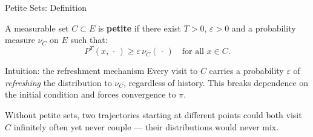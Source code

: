 \documentclass[aspectratio=169]{beamer}
\begin{document}
\begin{frame}{Petite Sets: Definition}

  \begin{definition}
    A measurable set $C \subset E$ is \textbf{petite} if there exist
    $T > 0$, $\varepsilon > 0$ and a probability measure $\nu_C$ on
    $E$ such that:
    \[
      P^T(x,\,\cdot\,) \geq \varepsilon\,\nu_C(\,\cdot\,)
      \quad \text{for all } x \in C.
    \]
  \end{definition}

  \bigskip
  \begin{block}{Intuition: the refreshment mechanism}
    Every visit to $C$ carries a probability $\varepsilon$ of
    \emph{refreshing} the distribution to $\nu_C$, regardless of
    history. This breaks dependence on the initial condition and
    forces convergence to $\pi$.

    \medskip
    Without petite sets, two trajectories starting at different
    points could both visit $C$ infinitely often yet never couple
    --- their distributions would never mix.
  \end{block}

\end{frame}
\end{document}
